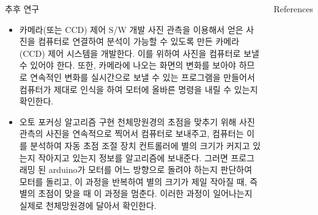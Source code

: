 \documentclass{gshs_poster_beamer}
\begin{document}
\begin{columns}[T]
\begin{posterbox}{추후 연구}
\begin{itemize}
	\item 카메라(또는 CCD) 제어 S/W 개발
	사진 관측을 이용해서 얻은 사진을 컴퓨터로 연결하여 분석이 가능할 수 있도록 만든 카메라(CCD) 제어 시스템을 개발한다. 이를 위하여 사진을 컴퓨터로 보낼 수 있어야 한다. 또한, 카메라에 나오는 화면의 변화를 보아야 하므로 연속적인 변화를 실시간으로 보낼 수 있는 프로그램을 만들어서 컴퓨터가 제대로 인식을 하여 모터에 올바른 명령을 내릴 수 있는지 확인한다.
	\item 오토 포커싱 알고리즘 구현
	천체망원경의 초점을 맞추기 위해 사진 관측의 사진을 연속적으로 찍어서 컴퓨터로 보내주고, 컴퓨터는 이를 분석하여 자동 초점 조절 장치 컨트롤러에 별의 크기가 커지고 있는지 작아지고 있는지 정보를 알고리즘에 보내준다. 그러면 프로그래밍 된 arduino가 모터를 어느 방향으로 돌려야 하는지 판단하여 모터를 돌리고, 이 과정을 반복하여 별의 크기가 제일 작아질 때, 즉 별의 초점이 맞을 때 이 과정을 멈춘다. 이러한 과정이 일어나는지 실제로 천체망원경에 달아서 확인한다.
\end{itemize}
\end{posterbox}

\vspace{1em}

\begin{posterbox}{References}
	

\end{posterbox}



\end{columns}
\end{document}
